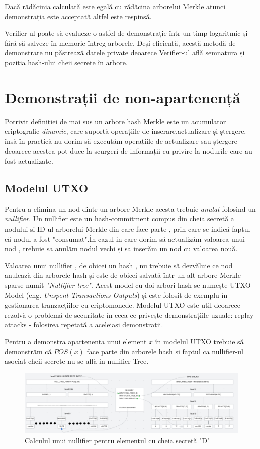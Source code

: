 \documentclass[12pt, letterpaper]{article}
\begin{document}
Dacă rădăcinia calculată este egală cu rădăcina arborelui Merkle atunci demonstrația este acceptată altfel este respinsă.

Verifier-ul poate să evalueze o astfel de demonstrație într-un timp logaritmic și fără să salveze în memorie întreg arborele. Deși eficientă, acestă metodă de demonstrare nu păstrează datele private deoarece Verifier-ul află semnatura și poziția hash-ului cheii secrete în arbore.

\section{Demonstrații de non-apartenență}
Potrivit definiției de mai sus un arbore hash Merkle este un acumulator criptografic \emph{dinamic}, care suportă operațiile de inserare,actualizare și ștergere, însă în practică nu dorim să executăm operațiile de actualizare sau ștergere deoarece acestea pot duce la scurgeri de informații cu privire la nodurile care au fost actualizate.

\subsection{Modelul UTXO}
Pentru a elimina un nod dintr-un arbore Merkle acesta trebuie \emph{anulat} folosind un \emph{nullifier}. Un nullifier este un hash-commitment compus din cheia secretă a nodului si ID-ul arborelui Merkle din care face parte , prin care se indică faptul că nodul a fost "consumat".În cazul in care dorim să actualizăm valoarea unui nod , trebuie sa anulăm nodul vechi și sa inserăm un nod cu valoarea nouă. 

Valoarea unui nullifier , de obicei un hash , nu trebuie să dezvăluie ce nod anulează din arborele hash și este de obicei salvată într-un alt arbore Merkle sparse numit \emph{"Nullifier tree"}. Acest model cu doi arbori hash se numește UTXO Model (eng. \emph{Unspent Transactions Outputs}) și este folosit de exemplu în gestionarea tranzacțiilor cu criptomonede. Modelul UTXO este util deoarece rezolvă o problemă de securitate în ceea ce privește demonstrațiile uzuale: replay attacks - folosirea repetată a aceleiași demonstrații.\cite{stanford_blockchain:2022}

Pentru a demonstra apartenența unui element $x$ în modelul UTXO trebuie să demonstrăm că $POS(x)$ face parte din arborele hash și faptul ca nullifier-ul asociat cheii secrete nu se află in nullifier Tree. 

\begin{figure}[ht]
    \centering
    \includegraphics[width=1\textwidth]{images/nullify.png}
    \caption{Calculul unui nullifier pentru elementul cu cheia secretă "D"}
    \label{fig:nullify_calc}
\end{figure}
\end{document}
